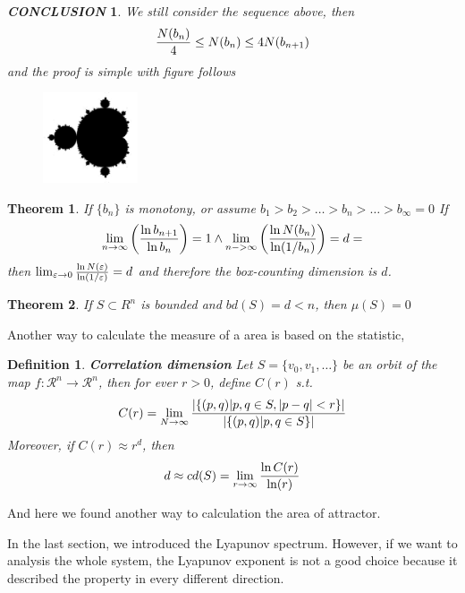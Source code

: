 \documentclass[12pt]{article}
\theoremstyle{plain}
\newtheorem{theorem}{\textbf{Theorem}}[section]
\newtheorem{definition}{{\color{red}\textbf{Definition}}}[section]
\newtheorem{conclusion}{\textit{\textbf{CONCLUSION}}}[section]
\begin{document}
\begin{conclusion}We still consider the sequence above, then 
$$
{N(b_n) \over 4} \leq N(b_n) \leq 4N(b_{n+1})
$$
and the proof is simple with figure follows
\begin{figure}[H]
\begin{center}
\includegraphics[width=0.25\textwidth]{figure/section4/mandelbrot.png} \\
\end{center}
\end{figure}
\end{conclusion}

\begin{theorem} If $\{b_n\}$ is monotony, or assume $b_1 > b_2 > \ldots > b_n > \ldots > b_\infty = 0$ If
$$
\lim_{n \rightarrow \infty} \left(\ln b_{n+1} \over \ln b_n\right) = 1 \land \lim_{n - >\infty}\left({\ln N(b_n) \over \ln(1 / b_n)}\right) = d=
$$
then $\lim_{\varepsilon \rightarrow 0}{\ln N(\varepsilon) \over \ln (1 / \varepsilon)} = d$ and therefore the box-counting dimension is $d$.
\end{theorem}


\begin{theorem} If $S \subset R^n$ is bounded and $bd(S) = d < n$, then $\mu(S) = 0$
\end{theorem}


Another way to calculate the measure of a area is based on the statistic, 
\begin{definition}\textbf{Correlation dimension}
Let $S = \{v_0, v_1, \ldots\}$ be an orbit of the map $f: \mathcal R^n \rightarrow \mathcal R^n$, then for ever $r > 0$, define $C(r)$ s.t.
$$
C(r) = \lim_{N \rightarrow \infty}{\left|\left\{(p, q)| p, q \in S, |p - q| < r\right\}\right| \over \left|\left\{(p, q)| p, q \in S\right\}\right|}
$$
Moreover, if $C(r) \approx r^d$, then
$$
d \approx cd(S) = \lim_{r \rightarrow \infty}{\ln C(r) \over \ln(r)}
$$
\end{definition}

And here we found another way to calculation the area of attractor.




In the last section, we introduced the Lyapunov spectrum. However, if we want to analysis the whole system, the Lyapunov exponent is not a good choice because it described the property in every different direction.
\end{document}
